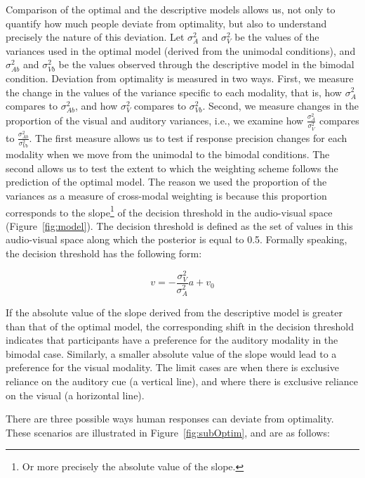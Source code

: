 \documentclass[english,,man,floatsintext]{apa6}
\let\rmarkdownfootnote\footnote%
\def\footnote{\protect\rmarkdownfootnote}
\theoremstyle{definition}
\theoremstyle{definition}
\theoremstyle{definition}
\theoremstyle{remark}
\begin{document}
Comparison of the optimal and the descriptive models allows us, not only
to quantify how much people deviate from optimality, but also to
understand precisely the nature of this deviation. Let \(\sigma^2_{A}\)
and \(\sigma^2_{V}\) be the values of the variances used in the optimal
model (derived from the unimodal conditions), and \(\sigma^2_{Ab}\) and
\(\sigma^2_{Vb}\) be the values observed through the descriptive model
in the bimodal condition. Deviation from optimality is measured in two
ways. First, we measure the change in the values of the variance
specific to each modality, that is, how \(\sigma^2_{A}\) compares to
\(\sigma^2_{Ab}\), and how \(\sigma^2_{V}\) compares to
\(\sigma^2_{Vb}\). Second, we measure changes in the proportion of the
visual and auditory variances, i.e., we examine how
\(\frac{\sigma^2_{A}}{\sigma^2_{V}}\) compares to
\(\frac{\sigma^2_{Ab}}{\sigma^2_{Vb}}\). The first measure allows us to
test if response precision changes for each modality when we move from
the unimodal to the bimodal conditions. The second allows us to test the
extent to which the weighting scheme follows the prediction of the
optimal model. The reason we used the proportion of the variances as a
measure of cross-modal weighting is because this proportion corresponds
to the
slope\footnote{Or more precisely the absolute value of the slope.} of
the decision threshold in the audio-visual space
(Figure~\ref{fig:model}). The decision threshold is defined as the set
of values in this audio-visual space along which the posterior is equal
to 0.5. Formally speaking, the decision threshold has the following
form:

\[v=-\frac{\sigma^2_V}{\sigma^2_A}a+v_0\]

If the absolute value of the slope derived from the descriptive model is
greater than that of the optimal model, the corresponding shift in the
decision threshold indicates that participants have a preference for the
auditory modality in the bimodal case. Similarly, a smaller absolute
value of the slope would lead to a preference for the visual modality.
The limit cases are when there is exclusive reliance on the auditory cue
(a vertical line), and where there is exclusive reliance on the visual
(a horizontal line).

There are three possible ways human responses can deviate from
optimality. These scenarios are illustrated in
Figure~\ref{fig:subOptim}, and are as follows:
\end{document}
